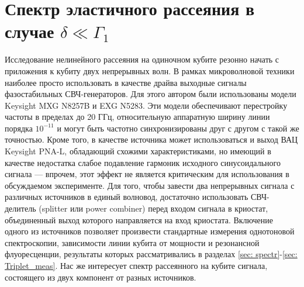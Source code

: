 \section{Спектр эластичного рассеяния в случае $\delta \ll \Gamma_1$}
Исследование нелинейного рассеяния на одиночном кубите резонно начать с приложения к кубиту двух непрерывных волн. В рамках микроволновой техники наиболее просто использовать в качестве драйва выходные сигналы фазостабильных СВЧ-генераторов. Для этого автором были использованы модели Keysight MXG N8257B и EXG N5283. Эти модели обеспечивают перестройку частоты в пределах до 20 ГГц, относительную аппаратную ширину линии порядка $10^{-11}$ и могут быть частотно синхронизированы друг с другом с такой же точностью. Кроме того, в качестве источника может использоваться и выход ВАЦ Keysight PNA-L, обладающий схожими характеристиками, но имеющий в качестве недостатка слабое подавление гармоник исходного синусоидального сигнала --- впрочем, этот эффект не является критическим для использования в обсуждаемом эксперименте. Для того, чтобы завести два непрерывных сигнала с различных источников в единый волновод, достаточно использовать СВЧ-делитель (splitter или power combiner) перед входом сигнала в криостат, объединенный выход которого направляется на вход криостата. Включение одного из источников позволяет произвести стандартные измерения однотоновой спектроскопии, зависимости линии кубита от мощности и резонансной флуоресценции, результаты которых рассматривались в разделах \ref{sec: spectr}-\ref{sec: Triplet_meas}. Нас же интересует спектр рассеянного на кубите сигнала, состоящего из двух компонент от разных источников.

